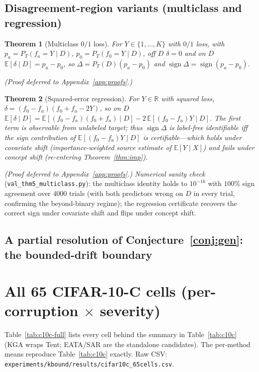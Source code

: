 \documentclass[11pt]{article}
\theoremstyle{plain}
\newtheorem{theorem}{Theorem}
\theoremstyle{definition}
\newcommand{\R}{\mathbb{R}}
\newcommand{\E}{\mathbb{E}}
\newcommand{\sign}{\operatorname{sign}}
\begin{document}
\subsection{Disagreement-region variants (multiclass and regression)}
\begin{theorem}[Multiclass $0/1$ loss]\label{thm:disagree-mc}
For $Y\in\{1,\dots,K\}$ with $0/1$ loss, with $p_a=P_T(f_a{=}Y\mid D)$,
$p_0=P_T(f_0{=}Y\mid D)$, off $D$ $\delta=0$ and on $D$ $\E[\delta\mid D]=p_a-p_0$, so
$\Delta=P_T(D)(p_a-p_0)$ and $\sign\Delta=\sign(p_a-p_0)$.
\end{theorem}
\emph{(Proof deferred to Appendix~\ref{app:proofs}.)}
\begin{theorem}[Squared-error regression]\label{thm:disagree-reg}
For $Y\in\R$ with squared loss, $\delta=(f_0-f_a)(f_0+f_a-2Y)$, so on $D$
$\E[\delta\mid D]=\E[(f_0-f_a)(f_0+f_a)\mid D]-2\,\E[(f_0-f_a)Y\mid D]$. The first term is
observable from unlabeled target; thus $\sign\Delta$ is label-free identifiable iff the
sign contribution of $\E[(f_0-f_a)Y\mid D]$ is certifiable---which holds under covariate
shift (importance-weighted source estimate of $\E[Y\mid X]$) and fails under concept
shift (re-entering Theorem~\ref{thm:imp}).
\end{theorem}
\emph{(Proof deferred to Appendix~\ref{app:proofs}.)}
\noindent\emph{Numerical sanity check} (\texttt{val\_thm5\_multiclass.py}): the multiclass
identity holds to $10^{-16}$ with $100\%$ sign agreement over $4000$ trials (with both
predictors wrong on $D$ in every trial, confirming the beyond-binary regime); the
regression certificate recovers the correct sign under covariate shift and flips under
concept shift.

\subsection{A partial resolution of Conjecture~\ref{conj:gen}: the bounded-drift boundary}\label{sec:regslice}
\section{All 65 CIFAR-10-C cells (per-corruption $\times$ severity)}\label{app:c10c}
Table~\ref{tab:c10c-full} lists every cell behind the summary in Table~\ref{tab:c10c}
(\textsc{KGA} wraps Tent; EATA/SAR are the standalone candidates). The per-method means
reproduce Table~\ref{tab:c10c} exactly. Raw CSV:
\texttt{experiments/kbound/results/cifar10c\_65cells.csv}.

\end{document}
